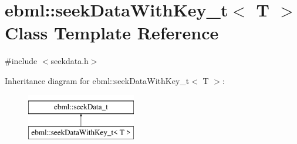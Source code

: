 \hypertarget{classebml_1_1seekDataWithKey__t}{}\section{ebml\+:\+:seek\+Data\+With\+Key\+\_\+t$<$ T $>$ Class Template Reference}
\label{classebml_1_1seekDataWithKey__t}


{\ttfamily \#include $<$seekdata.\+h$>$}

Inheritance diagram for ebml\+:\+:seek\+Data\+With\+Key\+\_\+t$<$ T $>$\+:\begin{figure}[H]
\begin{center}
\leavevmode
\includegraphics[height=2.000000cm]{classebml_1_1seekDataWithKey__t}
\end{center}
\end{figure}

